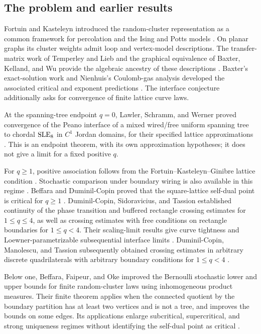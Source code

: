 \subsection{The problem and earlier results}

Fortuin and Kasteleyn introduced the random-cluster representation as
a common framework for percolation and the Ising and Potts models
\cite{FortuinKasteleyn1972}.  On planar graphs its cluster weights
admit loop and vertex-model descriptions.  The transfer-matrix work
of Temperley and Lieb and the graphical equivalence of Baxter,
Kelland, and Wu provide the algebraic ancestry of these descriptions
\cite{TemperleyLieb1971,BaxterKellandWu1976}.  Baxter's exact-solution
work and Nienhuis's Coulomb-gas analysis developed the associated
critical and exponent predictions \cite{Baxter1973,Nienhuis1984}.
The interface conjecture additionally asks for convergence of finite
lattice curve laws.

At the spanning-tree endpoint $q=0$, Lawler, Schramm, and Werner proved
convergence of the Peano interface of a mixed wired/free uniform spanning tree
to chordal $\operatorname{SLE}_8$ in $C^1$ Jordan domains, for their specified lattice
approximations \cite[Theorem~1.3]{LawlerSchrammWerner2004}.  This is an
endpoint theorem, with its own approximation hypotheses; it does not
give a limit for a fixed positive $q$.

For $q\ge1$, positive association follows from the
Fortuin--Kasteleyn--Ginibre lattice condition
\cite{FortuinKasteleynGinibre1971}.  Stochastic comparison under boundary
wiring is also available in this regime
\cite[Section~2.2]{DuminilCopinSidoraviciusTassion2017}.
Beffara and Duminil-Copin proved
that the square-lattice self-dual point is critical for $q\ge1$
\cite{BeffaraDuminilCopin2012}.  Duminil-Copin, Sidoravicius, and
Tassion established continuity of the phase transition and buffered
rectangle crossing estimates for $1\le q\le4$, as well as crossing
estimates with free conditions on rectangle boundaries for $1\le q<4$.
Their scaling-limit results give curve tightness and
Loewner-parametrizable subsequential interface limits
\cite{DuminilCopinSidoraviciusTassion2017}.  Duminil-Copin, Manolescu,
and Tassion subsequently obtained crossing estimates in arbitrary
discrete quadrilaterals with arbitrary boundary conditions for $1\le q<4$
\cite{DuminilCopinManolescuTassion2021}.

Below one, Beffara, Faipeur, and Oke improved the Bernoulli stochastic
lower and upper bounds for finite random-cluster laws using
inhomogeneous product measures.  Their finite theorem applies when the
connected quotient by the boundary partition has at least two vertices
and is not a tree, and improves the bounds on some edges.  Its
applications enlarge subcritical, supercritical, and strong uniqueness
regimes without identifying the self-dual point as critical
\cite[Theorems~1.2, 1.4, 1.10, and~1.11]{BeffaraFaipeurOke2025}.

